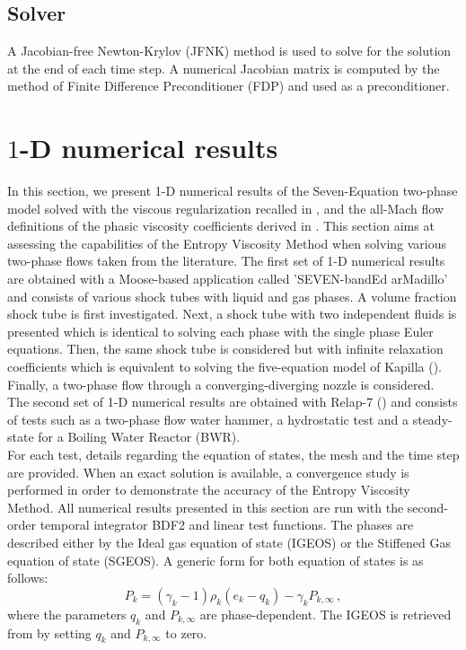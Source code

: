 \documentclass[preprint,10pt]{elsarticle}
\begin{document}
\subsection{Solver} \label{sec:solver}
%
A Jacobian-free Newton-Krylov (JFNK) method is used to solve for the solution at the end of each time step. A numerical Jacobian matrix is computed by the 
method of Finite Difference Preconditioner (FDP) and used as a preconditioner.
%
\section{$1$-D numerical results}\label{sec:results}
%
In this section, we present 1-D numerical results of the Seven-Equation two-phase model solved with the viscous regularization recalled in , 
and the all-Mach flow definitions of the phasic viscosity coefficients derived in . This section aims at assessing the capabilities of the Entropy 
Viscosity Method when solving various two-phase flows taken from the literature. The first set of 1-D numerical results are obtained with a Moose-based 
application called 'SEVEN-bandEd arMadillo' and consists of various shock tubes with liquid and gas phases. A volume fraction shock tube is first 
investigated. Next, a shock tube with two independent fluids is presented which is identical to solving each phase with the single phase Euler equations. 
Then, the same shock tube is considered but with infinite relaxation coefficients which is equivalent to solving the five-equation model of Kapilla (\cite{Kapila_2001}). 
Finally, a two-phase flow through a converging-diverging nozzle is considered. The second set of 1-D numerical results are obtained with Relap-7 (\cite{Berry_2014}) 
and consists of tests such as a two-phase flow water hammer, a hydrostatic test and a steady-state for a Boiling Water Reactor (BWR). \\
For each test, details regarding the equation of states, the mesh and the time step are provided. When an exact solution is available, a convergence study 
is performed in order to demonstrate the accuracy of the Entropy Viscosity Method. All numerical results presented in this section are run with the second-
order 
temporal integrator BDF2 and linear test functions. The phases are described either by the Ideal gas equation of state (IGEOS) or the Stiffened Gas equation 
of state (SGEOS). A generic form for both equation of states is as follows:
%
\begin{equation}\label{eq:generic-form}
P_k = (\gamma_k-1) \rho_k (e_k - q_k) - \gamma_k P_{k,\infty} \, ,
\end{equation}
%
where the parameters $q_k$ and $P_{k,\infty}$ are phase-dependent. The IGEOS is retrieved from  by setting $q_k$ and $P_{k,\infty}$ to 
zero.
%
\end{document}
